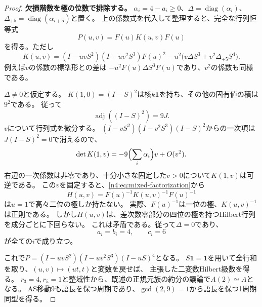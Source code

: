 \documentclass[11pt,a4paper]{ltjsarticle}
\theoremstyle{definition}
\begin{document}
\begin{proof}
\par\smallskip\noindent\textbf{欠損階数を極の位数で排除する。}\quad
$\alpha_i=4-a_i\ge0$、$\Delta=\operatorname{diag}(\alpha_i)$、
$\Delta_{+5}=\operatorname{diag}(\alpha_{i+5})$と置く。
上の係数式を代入して整理すると、完全な行列恒等式
\begin{equation}\label{n4:eq:mixed-factorization}
P(u,v)=F(u)K(u,v)F(u)
\end{equation}
を得る。ただし
\[
K(u,v)=(I-uvS^2)(I-uv^2S^3)F(u)^2
-u^2\bigl(v\Delta S^3+v^2\Delta_{+5}S^4\bigr).
\]
例えば$v$の係数の標準形との差は
$-u^2F(u)\Delta S^3F(u)$であり、$v^2$の係数も同様である。

$\Delta\ne0$と仮定する。
$K(1,0)=(I-S)^2$は核$k\boldsymbol1$を持ち、その他の固有値の積は$9^2$である。
従って
\[
\operatorname{adj}((I-S)^2)=9J.
\]
$v$について行列式を微分する。
$(I-vS^2)(I-v^2S^3)(I-S)^2$からの一次項は$J(I-S)^2=0$で消えるので、
\[
\det K(1,v)=-9\Bigl(\sum_i\alpha_i\Bigr)v+O(v^2).
\]
右辺の一次係数は非零であり、十分小さな固定した$v>0$について$K(1,v)$は可逆である。
この$v$を固定すると、\eqref{n4:eq:mixed-factorization}から
\[
H(u,v)=F(u)^{-1}K(u,v)^{-1}F(u)^{-1}
\]
は$u=1$で高々二位の極しか持たない。
実際、$F(u)^{-1}$は一位の極、$K(u,v)^{-1}$は正則である。
しかし$H(u,v)$は、差次数零部分の四位の極を持つHilbert行列を成分ごとに下回らない。
これは矛盾である。従って$\Delta=0$であり、
\[
a_i=b_i=4,\qquad c_i=6
\]
が全ての$i$で成り立つ。

これで$P=(I-uvS^2)(I-uv^2S^3)(I-uS)^4$となる。
$S\boldsymbol1=\boldsymbol1$を用いて全行和を取り、$(u,v)\mapsto(ut,t)$と変数を戻せば、
主張した二変数Hilbert級数を得る。
$r_3=4,r_5=1$と整域性から、既述の正規元族の約分の議論で$A(2)\simeq A$となる。
AS移動9も語長を保つ周期であり、$\gcd(2,9)=1$から語長を保つ1周期同型を得る。
\end{proof}
\end{document}
